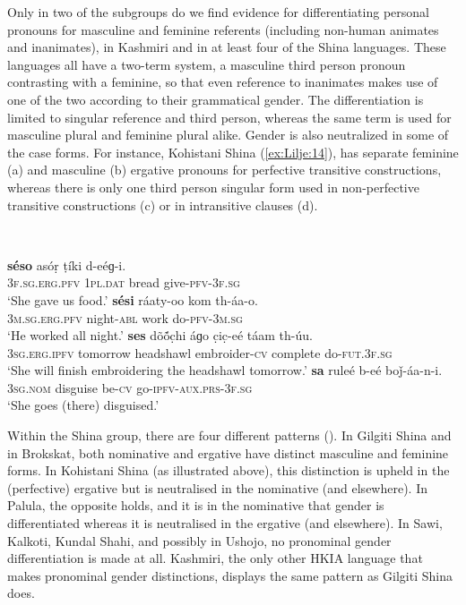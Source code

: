\documentclass[output=collectionpaper]{langsci/langscibook}
\begin{document}
Only in two of the subgroups do we find evidence for differentiating personal pronouns for masculine and feminine referents (including non-human animates and inanimates), in Kashmiri and in at least four of the Shina languages. These languages all have a two-term system, a masculine third person pronoun contrasting with a feminine, so that even reference to inanimates makes use of one of the two according to their grammatical gender. The differentiation is limited to singular reference and third person, whereas the same term is used for masculine plural and feminine plural alike. Gender is also neutralized in some of the case forms. For instance, Kohistani Shina (\ref{ex:Lilje:14}), has separate feminine (a) and masculine (b) ergative pronouns for perfective transitive constructions, whereas there is only one third person singular form used in non-perfective transitive constructions (c) or in intransitive clauses (d).

\ea
\label{ex:Lilje:14}
\\
\begin{xlist}
\ex
\gll \textbf{séso} asóṛ ṭíki d-eéɡ-i.    \\
\textsc{3f.sg.erg.pfv} \textsc{1pl.dat} bread give-\textsc{pfv-3f.sg}    \\
\glt `She gave us food.'
\ex
\gll \textbf{sési} ráaty-oo kom th-áa-o.    \\
\textsc{3m.sg.erg.pfv} night-\textsc{abl} work do-\textsc{pfv-3m.sg}    \\
\glt `He worked all night.'
\ex
\gll \textbf{ses} dõ\'{õ}c̣hi áɡo c̣ic̣-eé táam th-úu.  \\
\textsc{3sg.erg.ipfv} tomorrow headshawl embroider-\textsc{cv} complete do-\textsc{fut.3f.sg}  \\
\glt `She will finish embroidering the headshawl tomorrow.'
\ex
\gll \textbf{sa} ruleé b-eé boǰ-áa-n-i.    \\
\textsc{3sg.nom} disguise be-\textsc{cv} go-\textsc{ipfv-aux.prs-3f.sg}    \\
\glt `She goes (there) disguised.'  \\
\end{xlist}
\z

Within the Shina group, there are four different patterns (). In Gilgiti Shina and in Brokskat, both nominative and ergative have distinct masculine and feminine forms. In Kohistani Shina (as illustrated above), this distinction is upheld in the (perfective) ergative but is neutralised in the nominative (and elsewhere). In Palula, the opposite holds, and it is in the nominative that gender is differentiated whereas it is neutralised in the ergative (and elsewhere). In Sawi, Kalkoti, Kundal Shahi, and possibly in Ushojo, no pronominal gender differentiation is made at all. Kashmiri, the only other HKIA language that makes pronominal gender distinctions, displays the same pattern as Gilgiti Shina does.
\end{document}
